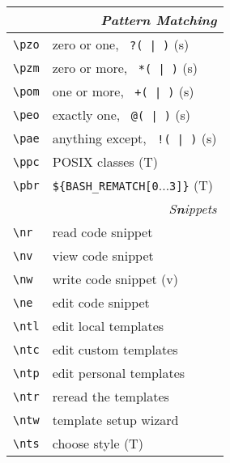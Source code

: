 \documentclass[oneside,11pt,landscape,DIV16]{scrartcl}
\begin{document}
\begin{multicols}{3}
\begin{center}
\begin{tabular}[]{|p{11mm}|p{60mm}|}
\hline
%
\hline
\multicolumn{2}{|r|}{\textsl{\textbf{P}attern Matching}}     \\[1.0ex]
\hline \verb'\pzo' & zero or one,      \verb' ?( | )'  \hfill (s)\\
\hline \verb'\pzm' & zero or more,     \verb' *( | )'  \hfill (s)\\
\hline \verb'\pom' & one or more,      \verb' +( | )'  \hfill (s)\\
\hline \verb'\peo' & exactly one,      \verb' @( | )'  \hfill (s)\\
\hline \verb'\pae' & anything except,  \verb' !( | )'  \hfill (s)\\
\hline \verb'\ppc' & POSIX classes                     \hfill (T)\\
\hline \verb'\pbr' &  \verb'${BASH_REMATCH[0'$\ldots$\verb'3]}'  \hfill (T)\\
\hline
%
\hline
\multicolumn{2}{|r|}{\textsl{S\textbf{n}ippets}}               \\[1.0ex]
\hline \verb'\nr'  & read code snippet         \\
\hline \verb'\nv'  & view code snippet         \\
\hline \verb'\nw'  & write code snippet        \hfill (v)\\
\hline \verb'\ne'  & edit code snippet         \\
%
\hline \verb'\ntl' & edit local templates      \\
\hline \verb'\ntc' & edit custom templates     \\
\hline \verb'\ntp' & edit personal templates   \\
\hline \verb'\ntr' & reread the templates      \\
\hline \verb'\ntw' & template setup wizard     \\
\hline \verb'\nts' & choose style              \hfill (T)\\
\hline
\end{tabular}\\[1.0ex]
%

\end{center}
\end{multicols}
\end{document}
